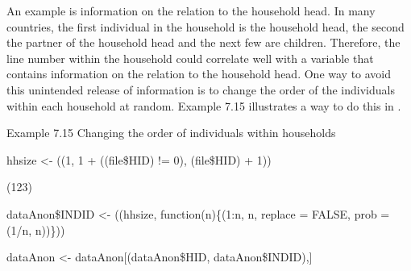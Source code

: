 \documentclass[letterpaper,10pt,english]{sphinxmanual}
\begin{document}
 An example is information on the relation to the
household head. In many countries, the first individual in the household
is the household head, the second the partner of the household head and
the next few are children. Therefore, the line number within the
household could correlate well with a variable that contains information
on the relation to the household head. One way to avoid this unintended
release of information is to change the order of the individuals within
each household at random. Example 7.15 illustrates a way to do this in
.

Example 7.15 Changing the order of individuals within households

\begin{DUlineblock}{0em}
\item[] 
\item[] hhsize \textless{}- ((1, 1 + ((file\$HID)
!= 0), (file\$HID) + 1))
\end{DUlineblock}

\begin{DUlineblock}{0em}
\item[] 
\item[] (123)
\item[] dataAnon\$INDID \textless{}- ((hhsize,
function(n)\{(1:n, n, replace = FALSE, prob =
(1/n, n))\}))
\end{DUlineblock}

\begin{DUlineblock}{0em}
\item[] 
\item[] dataAnon \textless{}- dataAnon{[}(dataAnon\$HID, dataAnon\$INDID),{]}
\end{DUlineblock}
\end{document}
